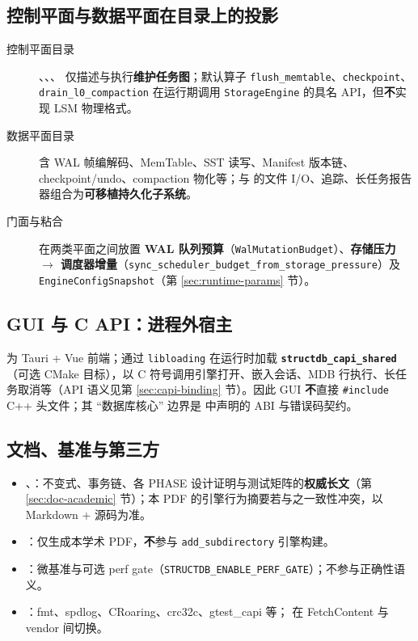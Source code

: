 \subsection{控制平面与数据平面在目录上的投影}

\begin{description}
  \item[控制平面目录] 、、、 仅描述与执行\textbf{维护任务图}；默认算子 \texttt{flush\_memtable}、\texttt{checkpoint}、\texttt{drain\_l0\_compaction} 在运行期调用 \texttt{StorageEngine} 的具名 API，但\textbf{不}实现 LSM 物理格式。
  \item[数据平面目录]  含 WAL 帧编解码、MemTable、SST 读写、Manifest 版本链、checkpoint/undo、compaction 物化等；与  的文件 I/O、追踪、长任务报告器组合为\textbf{可移植持久化子系统}。
  \item[门面与粘合]  在两类平面之间放置 \textbf{WAL 队列预算}（\texttt{WalMutationBudget}）、\textbf{存储压力 $\rightarrow$ 调度器增量}（\texttt{sync\_scheduler\_budget\_from\_storage\_pressure}）及 \texttt{EngineConfigSnapshot}（第 \ref{sec:runtime-params} 节）。
\end{description}

\subsection{GUI 与 C API：进程外宿主}

 为 Tauri + Vue 前端；通过 \texttt{libloading} 在运行时加载 \textbf{\texttt{structdb\_capi\_shared}}（可选 CMake 目标），以 C 符号调用引擎打开、嵌入会话、MDB 行执行、长任务取消等（API 语义见第 \ref{sec:capi-binding} 节）。因此 GUI \textbf{不}直接 \texttt{\#include} C++ 头文件；其 ``数据库核心'' 边界是  中声明的 ABI 与错误码契约。

\subsection{文档、基准与第三方}

\begin{itemize}
  \item {}、：不变式、事务链、各 PHASE 设计证明与测试矩阵的\textbf{权威长文}（第 \ref{sec:doc-academic} 节）；本 PDF 的引擎行为摘要若与之一致性冲突，以 Markdown + 源码为准。
  \item {}：仅生成本学术 PDF，\textbf{不}参与 \texttt{add\_subdirectory} 引擎构建。
  \item {}：微基准与可选 perf gate（\texttt{STRUCTDB\_ENABLE\_PERF\_GATE}）；不参与正确性语义。
  \item {}：fmt、spdlog、CRoaring、crc32c、gtest\_capi 等； 在 FetchContent 与 vendor 间切换。
\end{itemize}


